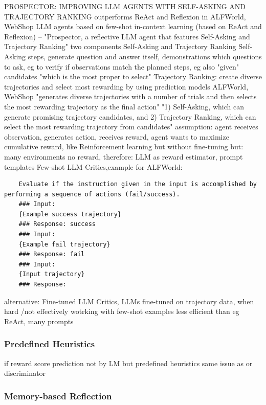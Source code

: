 \documentclass{article}
\begin{document}
\cite{kim_prospector_2024} PROSPECTOR: IMPROVING LLM AGENTS WITH SELF-ASKING AND TRAJECTORY RANKING
outperforms ReAct and Reflexion in ALFWorld, WebShop
LLM agents based on few-shot in-context learning (based on ReAct and Reflexion) --  "Prospector, a reflective LLM agent that features Self-Asking and Trajectory Ranking"
two components Self-Asking and Trajectory Ranking
Self-Asking steps, generate question and answer itself, demonstrations which questions to ask, eg to verify if observations match the planned steps, eg also "given" candidates "which is the most proper to select"
Trajectory Ranking: create diverse trajectories and select most rewarding by using prediction models
ALFWorld, WebShop
"generates diverse trajectories with a number of trials and then selects the most rewarding trajectory as the final action"
"1) Self-Asking, which can generate promising trajectory candidates, and 2) Trajectory Ranking, which can select the most rewarding trajectory from candidates"
assumption: agent receives observation, generates action, receives reward, agent wants to maximize cumulative reward, like Reinforcement learning but without fine-tuning
but: many environments no reward, therefore: LLM as reward estimator, prompt templates
Few-shot LLM Critics,example for ALFWorld:
\begin{verbatim}
	Evaluate if the instruction given in the input is accomplished by performing a sequence of actions (fail/success). 
	### Input:
	{Example success trajectory} 
	### Response: success 
	### Input: 
	{Example fail trajectory} 
	### Response: fail 
	### Input: 
	{Input trajectory} 
	### Response:
\end{verbatim}
alternative: Fine-tuned LLM Critics, LLMs fine-tuned on trajectory data, when hard /not effectively wotrking with few-shot examples
less efficient than eg ReAct, many prompts

\subsubsection{Predefined Heuristics}
if reward score prediction not by LM but predefined heuristics
same issue as or discriminator

\subsubsection{Memory-based Reflection}


\end{document}
